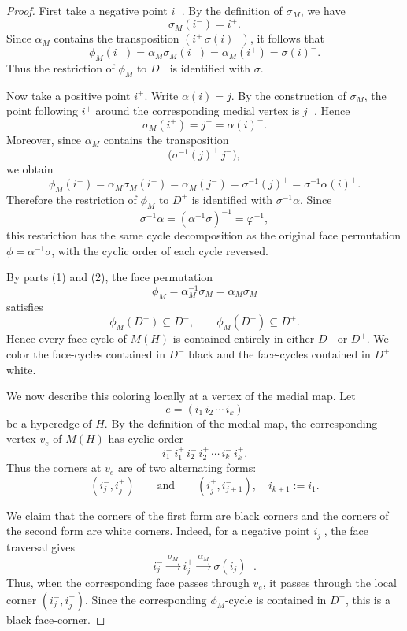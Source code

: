 \documentclass[10pt,a4paper]{amsart}
\begin{document}
\begin{proof}
First take a negative point \(i^-\). By the definition of \(\sigma_M\), we have
\[
    \sigma_M(i^-)=i^+.
\]
Since \(\alpha_M\) contains the transposition \((i^+\,\sigma(i)^-)\), it follows that
\[
    \phi_M(i^-)
    =\alpha_M\sigma_M(i^-)
    =\alpha_M(i^+)
    =\sigma(i)^-.
\]
Thus the restriction of \(\phi_M\) to \(D^-\) is identified with \(\sigma\).

Now take a positive point \(i^+\). Write \(\alpha(i)=j\). By the construction of
\(\sigma_M\), the point following \(i^+\) around the corresponding medial vertex is
\(j^-\). Hence
\[
    \sigma_M(i^+)=j^-=\alpha(i)^-.
\]
Moreover, since \(\alpha_M\) contains the transposition
\[
    \bigl(\sigma^{-1}(j)^+\,j^-\bigr),
\]
we obtain
\[
    \phi_M(i^+)
    =\alpha_M\sigma_M(i^+)
    =\alpha_M(j^-)
    =\sigma^{-1}(j)^+
    =\sigma^{-1}\alpha(i)^+.
\]
Therefore the restriction of \(\phi_M\) to \(D^+\) is identified with
\(\sigma^{-1}\alpha\). Since
\[
    \sigma^{-1}\alpha=(\alpha^{-1}\sigma)^{-1}=\varphi^{-1},
\]
this restriction has the same cycle decomposition as the original face permutation
\(\phi=\alpha^{-1}\sigma\), with the cyclic order of each cycle reversed.

By parts (1) and (2), the face permutation
\[
        \phi_M=\alpha_M^{-1}\sigma_M=\alpha_M\sigma_M
\]
satisfies
\[
        \phi_M(D^-)\subseteq D^-,
        \qquad
        \phi_M(D^+)\subseteq D^+ .
\]
Hence every face-cycle of \(M(H)\) is contained entirely in either
\(D^-\) or \(D^+\). We color the face-cycles contained in \(D^-\) black
and the face-cycles contained in \(D^+\) white.

We now describe this coloring locally at a vertex of the medial map. Let
\[
        e=(i_1\,i_2\,\cdots\,i_k)
\]
be a hyperedge of \(H\). By the definition of the medial map, the
corresponding vertex \(v_e\) of \(M(H)\) has cyclic order
\[
        i_1^-\, i_1^+\, i_2^-\, i_2^+\,\cdots\, i_k^-\, i_k^+ .
\]
Thus the corners at \(v_e\) are of two alternating forms:
\[
        (i_j^-,i_j^+)
        \qquad\text{and}\qquad
        (i_j^+,i_{j+1}^-),
        \quad i_{k+1}:=i_1 .
\]

We claim that the corners of the first form are black corners and the
corners of the second form are white corners. Indeed, for a negative
point \(i_j^-\), the face traversal gives
\[
        i_j^-
        \xrightarrow{\ \sigma_M\ }
        i_j^+
        \xrightarrow{\ \alpha_M\ }
        \sigma(i_j)^- .
\]
Thus, when the corresponding face passes through \(v_e\), it passes
through the local corner \((i_j^-,i_j^+)\). Since the corresponding
\(\phi_M\)-cycle is contained in \(D^-\), this is a black face-corner.


\end{proof}
\end{document}
